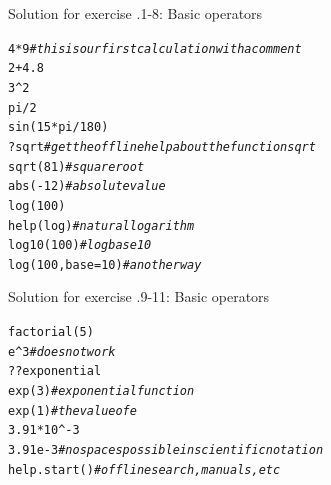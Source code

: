 \documentclass[xcolor=table,           xcolor=dvipsnames]{beamer}\usepackage[]{graphicx}\usepackage[]{color}
\makeatletter
\newcommand{\hlnum}[1]{\textcolor[rgb]{0,0,0}{#1}}
\newcommand{\hlcom}[1]{\textcolor[rgb]{0,0.392,0}{\textit{#1}}}
\newcommand{\hlopt}[1]{\textcolor[rgb]{0,0,0}{#1}}
\newcommand{\hlstd}[1]{\textcolor[rgb]{0,0,0}{#1}}
\newcommand{\hlkwc}[1]{\textcolor[rgb]{1,0,1}{#1}}
\newcommand{\hlkwd}[1]{\textcolor[rgb]{0,0,1}{#1}}
\newenvironment{kframe}{%
 \def\at@end@of@kframe{}%
 \ifinner\ifhmode%
  \def\at@end@of@kframe{\end{minipage}}%
  \begin{minipage}{\columnwidth}%
 \fi\fi%
 \def\FrameCommand##1{\hskip\@totalleftmargin \hskip-\fboxsep
 \colorbox{shadecolor}{##1}\hskip-\fboxsep
     \hskip-\linewidth \hskip-\@totalleftmargin \hskip\columnwidth}%
 \MakeFramed {\advance\hsize-\width
   \@totalleftmargin\z@ \linewidth\hsize
   \@setminipage}}%
 {\par\unskip\endMakeFramed%
 \at@end@of@kframe}
\newenvironment{knitrout}{}{} %
\newcounter{exercisecount}
\makeatother
\begin{document}

\begin{frame}[fragile]{Solution for exercise .1-8: Basic operators}
\begin{knitrout}
\color{fgcolor}\begin{kframe}
\begin{alltt}
\hlnum{4}\hlopt{*}\hlnum{9} \hlcom{# this is our first calculation with a comment}
\hlnum{2} \hlopt{+} \hlnum{4.8}
\hlnum{3}\hlopt{^}\hlnum{2}
\hlstd{pi}\hlopt{/}\hlnum{2}
\hlkwd{sin}\hlstd{(}\hlnum{15}\hlopt{*}\hlstd{pi}\hlopt{/}\hlnum{180}\hlstd{)}
\hlopt{?}\hlstd{sqrt} \hlcom{# get the offline help about the function sqrt}
\hlkwd{sqrt}\hlstd{(}\hlnum{81}\hlstd{)} \hlcom{# square root}
\hlkwd{abs}\hlstd{(}\hlopt{-}\hlnum{12}\hlstd{)} \hlcom{# absolute value}
\hlkwd{log}\hlstd{(}\hlnum{100}\hlstd{)}
\hlkwd{help}\hlstd{(log)} \hlcom{# natural logarithm}
\hlkwd{log10}\hlstd{(}\hlnum{100}\hlstd{)} \hlcom{# log base 10}
\hlkwd{log}\hlstd{(}\hlnum{100}\hlstd{,} \hlkwc{base}\hlstd{=}\hlnum{10}\hlstd{)} \hlcom{# another way}
\end{alltt}
\end{kframe}
\end{knitrout}
\end{frame}


\begin{frame}[fragile]{Solution for exercise .9-11: Basic operators}
\begin{knitrout}
\color{fgcolor}\begin{kframe}
\begin{alltt}
\hlkwd{factorial}\hlstd{(}\hlnum{5}\hlstd{)}
\hlstd{e}\hlopt{^}\hlnum{3} \hlcom{# does not work}
\hlopt{??}\hlstd{exponential}
\hlkwd{exp}\hlstd{(}\hlnum{3}\hlstd{)} \hlcom{# exponential function}
\hlkwd{exp}\hlstd{(}\hlnum{1}\hlstd{)} \hlcom{# the value of e}
\hlnum{3.91} \hlopt{*} \hlnum{10}\hlopt{^-}\hlnum{3}
\hlnum{3.91e-3} \hlcom{# no spaces possible in scientific notation}
\hlkwd{help.start}\hlstd{()} \hlcom{# offline search, manuals, etc}
\end{alltt}
\end{kframe}
\end{knitrout}
\end{frame}
\end{document}
